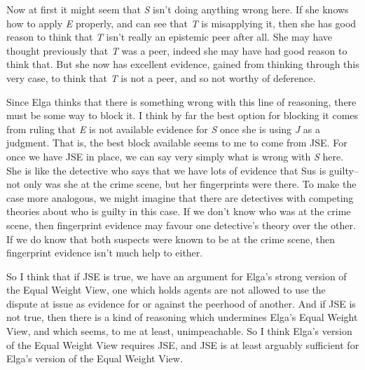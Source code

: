\documentclass[
  11pt,
  letterpaper,
  DIV=11,
  numbers=noendperiod,
  twoside]{scrartcl}
\begin{document}
Now at first it might seem that \emph{S} isn't doing anything wrong
here. If she knows how to apply \emph{E} properly, and can see that
\emph{T} is misapplying it, then she has good reason to think that
\emph{T} isn't really an epistemic peer after all. She may have thought
previously that \emph{T} was a peer, indeed she may have had good reason
to think that. But she now has excellent evidence, gained from thinking
through this very case, to think that \emph{T} is not a peer, and so not
worthy of deference.

Since Elga thinks that there is something wrong with this line of
reasoning, there must be some way to block it. I think by far the best
option for blocking it comes from ruling that \emph{E} is not available
evidence for \emph{S} once she is using \emph{J} as a judgment. That is,
the best block available seems to me to come from JSE. For once we have
JSE in place, we can say very simply what is wrong with \emph{S} here.
She is like the detective who says that we have lots of evidence that
Sus is guilty--not only was she at the crime scene, but her fingerprints
were there. To make the case more analogous, we might imagine that there
are detectives with competing theories about who is guilty in this case.
If we don't know who was at the crime scene, then fingerprint evidence
may favour one detective's theory over the other. If we do know that
both suspects were known to be at the crime scene, then fingerprint
evidence isn't much help to either.

So I think that if JSE is true, we have an argument for Elga's strong
version of the Equal Weight View, one which holds agents are not allowed
to use the dispute at issue as evidence for or against the peerhood of
another. And if JSE is not true, then there is a kind of reasoning which
undermines Elga's Equal Weight View, and which seems, to me at least,
unimpeachable. So I think Elga's version of the Equal Weight View
requires JSE, and JSE is at least arguably sufficient for Elga's version
of the Equal Weight View.
\end{document}
